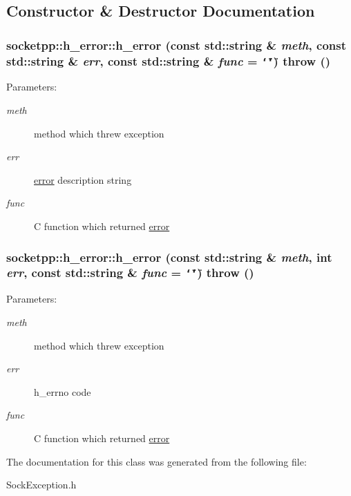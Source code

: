\subsection{Constructor \& Destructor Documentation}
\hypertarget{classsocketpp_1_1h__error_c15a1c6216114250241349fdfcdeb98a}{
\subsubsection[{h\_\-error}]{\setlength{\rightskip}{0pt plus 5cm}socketpp::h\_\-error::h\_\-error (const std::string \& {\em meth}, \/  const std::string \& {\em err}, \/  const std::string \& {\em func} = {\tt \char`\"{}\char`\"{}})  throw ()}}
\label{classsocketpp_1_1h__error_c15a1c6216114250241349fdfcdeb98a}


\begin{Desc}
\item[Parameters:]
\begin{description}
\item[{\em meth}]method which threw exception \item[{\em err}]\hyperlink{classsocketpp_1_1error}{error} description string \item[{\em func}]C function which returned \hyperlink{classsocketpp_1_1error}{error} \end{description}
\end{Desc}
\hypertarget{classsocketpp_1_1h__error_67e7b6bcd23ebdd79a5fdcf1f01070fe}{
\subsubsection[{h\_\-error}]{\setlength{\rightskip}{0pt plus 5cm}socketpp::h\_\-error::h\_\-error (const std::string \& {\em meth}, \/  int {\em err}, \/  const std::string \& {\em func} = {\tt \char`\"{}\char`\"{}})  throw ()}}
\label{classsocketpp_1_1h__error_67e7b6bcd23ebdd79a5fdcf1f01070fe}


\begin{Desc}
\item[Parameters:]
\begin{description}
\item[{\em meth}]method which threw exception \item[{\em err}]h\_\-errno code \item[{\em func}]C function which returned \hyperlink{classsocketpp_1_1error}{error} \end{description}
\end{Desc}


The documentation for this class was generated from the following file:\begin{CompactItemize}
\item 
SockException.h\end{CompactItemize}
